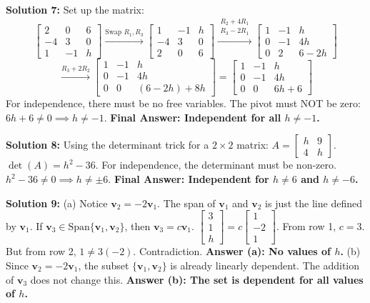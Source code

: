 \documentclass[12pt]{article}
\begin{document}
\textbf{Solution 7:} Set up the matrix:
$$ \begin{bmatrix} 2 & 0 & 6 \\ -4 & 3 & 0 \\ 1 & -1 & h \end{bmatrix} \xrightarrow{\text{Swap } R_1, R_3} \begin{bmatrix} 1 & -1 & h \\ -4 & 3 & 0 \\ 2 & 0 & 6 \end{bmatrix} \xrightarrow{\substack{R_2 + 4R_1 \\ R_3 - 2R_1}} \begin{bmatrix} 1 & -1 & h \\ 0 & -1 & 4h \\ 0 & 2 & 6-2h \end{bmatrix} $$
$$ \xrightarrow{R_3 + 2R_2} \begin{bmatrix} 1 & -1 & h \\ 0 & -1 & 4h \\ 0 & 0 & (6-2h) + 8h \end{bmatrix} = \begin{bmatrix} 1 & -1 & h \\ 0 & -1 & 4h \\ 0 & 0 & 6h+6 \end{bmatrix} $$
For independence, there must be no free variables. The pivot must NOT be zero: $6h + 6 \neq 0 \implies h \neq -1$. \textbf{Final Answer: Independent for all $h \neq -1$.}

\textbf{Solution 8:} Using the determinant trick for a $2 \times 2$ matrix: $A = \begin{bmatrix} h & 9 \\ 4 & h \end{bmatrix}$. 
$\det(A) = h^2 - 36$. For independence, the determinant must be non-zero. $h^2 - 36 \neq 0 \implies h \neq \pm 6$. \textbf{Final Answer: Independent for $h \neq 6$ and $h \neq -6$.}

\textbf{Solution 9:} (a) Notice $\mathbf{v}_2 = -2\mathbf{v}_1$. The span of $\mathbf{v}_1$ and $\mathbf{v}_2$ is just the line defined by $\mathbf{v}_1$. If $\mathbf{v}_3 \in \text{Span}\{\mathbf{v}_1, \mathbf{v}_2\}$, then $\mathbf{v}_3 = c\mathbf{v}_1$. 
$\begin{bmatrix} 3 \\ 1 \\ h \end{bmatrix} = c\begin{bmatrix} 1 \\ -2 \\ 1 \end{bmatrix}$. From row 1, $c = 3$. But from row 2, $1 \neq 3(-2)$. Contradiction. \textbf{Answer (a): No values of $h$.}
(b) Since $\mathbf{v}_2 = -2\mathbf{v}_1$, the subset $\{\mathbf{v}_1, \mathbf{v}_2\}$ is already linearly dependent. The addition of $\mathbf{v}_3$ does not change this. \textbf{Answer (b): The set is dependent for all values of $h$.}
\end{document}
